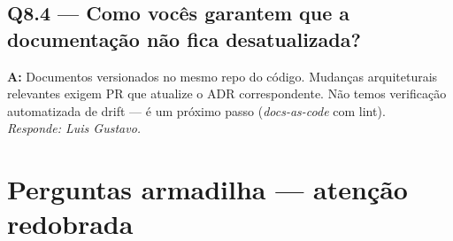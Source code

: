 \documentclass[12pt,a4paper]{article}
\begin{document}
\subsection*{Q8.4 — Como vocês garantem que a documentação não fica desatualizada?}
\textbf{A:} Documentos versionados no mesmo repo do código. Mudanças
arquiteturais relevantes exigem PR que atualize o ADR correspondente.
Não temos verificação automatizada de drift — é um próximo passo
(\textit{docs-as-code} com lint).
\\[2pt] \textit{Responde: Luis Gustavo.}

\newpage

\section*{Perguntas armadilha — atenção redobrada}
\end{document}
